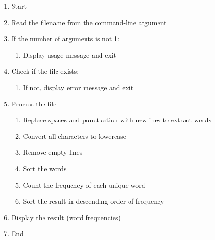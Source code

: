 \begin{enumerate}
    \item Start
    \item Read the filename from the command-line argument
    \item If the number of arguments is not 1:
    \begin{enumerate}
        \item Display usage message and exit
    \end{enumerate}
    \item Check if the file exists:
    \begin{enumerate}
        \item If not, display error message and exit
    \end{enumerate}
    \item Process the file:
    \begin{enumerate}
        \item Replace spaces and punctuation with newlines to extract words
        \item Convert all characters to lowercase
        \item Remove empty lines
        \item Sort the words
        \item Count the frequency of each unique word
        \item Sort the result in descending order of frequency
    \end{enumerate}
    \item Display the result (word frequencies)
    \item End
\end{enumerate}
